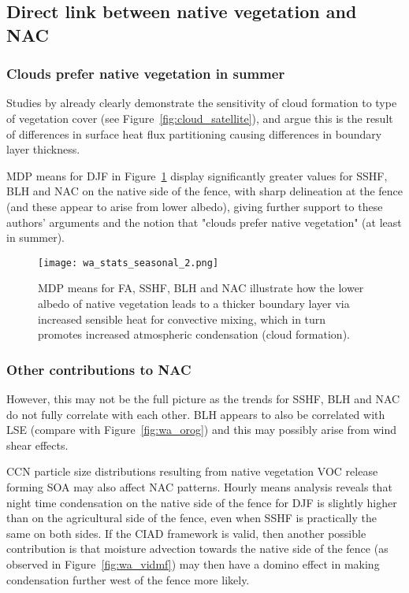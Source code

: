 \subsection{Direct link between native vegetation and NAC}
\label{ssec:native_nac}

\subsubsection{Clouds prefer native vegetation in summer}

Studies by \citet{lyons1993, lyons1996, lyons2002, ray2003, nair2011} already clearly demonstrate the sensitivity of cloud formation to type of vegetation cover (see Figure~\ref{fig:cloud_satellite}), and argue this is the result of differences in surface heat flux partitioning causing differences in boundary layer thickness.

\ac{MDP} means for \ac{DJF} in Figure~\ref{fig:wa_stats_seasonal_2} display significantly greater values for \ac{SSHF}, \ac{BLH} and \ac{NAC} on the native side of the fence, with sharp delineation at the fence (and these appear to arise from lower albedo), giving further support to these authors' arguments and the notion that "clouds prefer native vegetation" \citep{lyons2002} (at least in summer).

\begin{figure}[!htp]
	\centering
	\texttt{[image: wa\_stats\_seasonal\_2.png]}
	\caption[Selected MDP means with fence delineations]{\acs{MDP} means for \acs{FA}, \acs{SSHF}, \acs{BLH} and \acs{NAC} illustrate how the lower albedo of native vegetation leads to a thicker boundary layer via increased sensible heat for convective mixing, which in turn promotes increased atmospheric condensation (cloud formation).}
	\label{fig:wa_stats_seasonal_2}
\end{figure}

\subsubsection{Other contributions to NAC}

However, this may not be the full picture as the trends for \ac{SSHF}, \ac{BLH} and \ac{NAC} do not fully correlate with each other. \ac{BLH} appears to also be correlated with \ac{LSE} (compare with Figure~\ref{fig:wa_orog}) and this may possibly arise from wind shear effects.

\ac{CCN} particle size distributions resulting from native vegetation \ac{VOC} release forming \ac{SOA} may also affect \ac{NAC} patterns. Hourly means analysis reveals that night time condensation on the native side of the fence for \ac{DJF} is slightly higher than on the agricultural side of the fence, even when \ac{SSHF} is practically the same on both sides. If the \ac{CIAD} framework is valid, then another possible contribution is that moisture advection towards the native side of the fence (as observed in Figure~\ref{fig:wa_vidmf}) may then have a domino effect in making condensation further west of the fence more likely.

